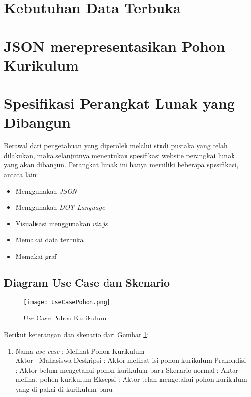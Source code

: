 \section{Kebutuhan Data Terbuka}
\label{sec: Kebutuhan Data Terbuka}


\section{JSON merepresentasikan Pohon Kurikulum}
\label{sec: JSON merepresentasikan Pohon Kurikulum}


\section{Spesifikasi Perangkat Lunak yang Dibangun}
\label{sec: Spesifikasi Perangkat Lunak yang Dibangun}

Berawal dari pengetahuan yang diperoleh melalui studi pustaka yang telah dilakukan, maka selanjutnya
menentukan spesifikasi website perangkat lunak yang akan dibangun. Perangkat lunak ini hanya
memiliki beberapa spesifikasi, antara lain:
\begin{itemize}
\item Menggunakan \textit{JSON} 
\item Menggunakan \textit{DOT Language}
\item Visualisasi menggunakan \textit{viz.js}
\item Memakai data terbuka
\item Memakai graf
\end{itemize}

\subsection{Diagram Use Case dan Skenario}
\label{sec: Diagram Use Case dan Skenario}

\begin{figure}[H]
		\centering
		\texttt{[image: UseCasePohon.png]}
		\caption{Use Case Pohon Kurikulum}
		\label{fig: Use Case Pohon Kurikulum}
\end{figure}	

Berikut keterangan dan skenario dari Gambar \ref{fig: Use Case Pohon Kurikulum}:
\begin{enumerate}
\item Nama \textit{use case} : Melihat Pohon Kurikulum \\
	  Aktor : Mahasiswa 
	  Deskripsi :  Aktor melihat isi pohon kurikulum 
	  Prakondisi : Aktor belum mengetahui pohon kurikulum baru 
	  Skenario normal : Aktor melihat pohon kurikulum
	  Eksepsi : Aktor telah mengetahui pohon kurikulum yang di pakai di kurikulum baru
	  
\end{enumerate}


